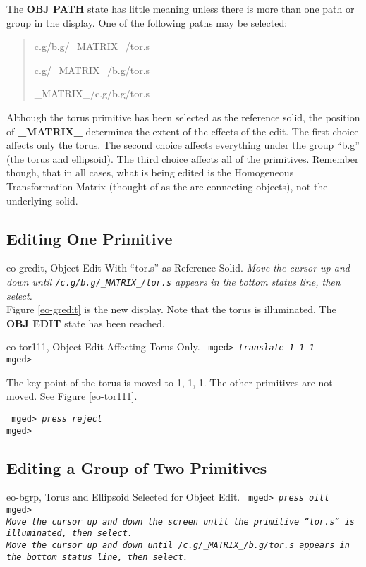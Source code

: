 The {\bf OBJ PATH} state has little meaning unless there is more than one path
or group in the display.  One of the following paths may be selected:

\begin{quote}
c.g/b.g/\_MATRIX\_/tor.s

c.g/\_MATRIX\_/b.g/tor.s

\_MATRIX\_/c.g/b.g/tor.s
\end{quote}

Although the torus primitive has been selected as the reference solid,
the position of {\bf \_MATRIX\_} determines the extent of the effects of
the edit.  The first choice affects only the torus.  The second choice
affects everything under the group ``b.g'' (the torus and ellipsoid).
The third choice affects all of the primitives.  Remember though, that
in all cases, what is being edited is the Homogeneous Transformation
Matrix (thought of as the arc connecting objects), not the underlying
solid.

\subsection{Editing One Primitive}

\mfig eo-gredit, Object Edit With ``tor.s'' as Reference Solid.
\noindent
{\em Move the cursor up and down until {\tt /c.g/b.g/\_MATRIX\_/tor.s} appears
in the bottom status line, then select.}\\

Figure \ref{eo-gredit} is the new display.  Note that the torus is
illuminated. The {\bf OBJ EDIT} state has been reached.

\mfig eo-tor111, Object Edit Affecting Torus Only.
\noindent
{\tt
mged> {\em translate 1 1 1}\\
mged>\\
}

The key point of the torus is moved to 1, 1, 1.  The other primitives are
not moved.  See Figure \ref{eo-tor111}.

\noindent
{\tt
mged> {\em press reject}\\
mged>\\
}

\subsection{Editing a Group of Two Primitives}

\mfig eo-bgrp, Torus and Ellipsoid Selected for Object Edit.
\noindent
{\tt
mged> {\em press oill}\\
mged>\\
{\em Move the cursor up and down the screen until the primitive ``tor.s''
is illuminated, then select.}\\
{\em Move the cursor up and down until {\tt /c.g/\_MATRIX\_/b.g/tor.s} appears
in the bottom status line, then select.}\\
}

